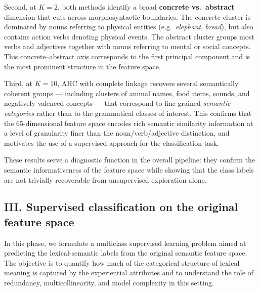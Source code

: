 \documentclass{ipgpmaster}
\begin{document}
Second, at $K = 2$, both methods identify a broad
\textbf{concrete vs.\ abstract} dimension that cuts across
morphosyntactic boundaries. The concrete cluster is dominated by nouns
referring to physical entities (e.g.\ \emph{elephant}, \emph{bread}),
but also contains action verbs denoting physical events.
The abstract cluster groups most verbs and adjectives together with
nouns referring to mental or social concepts.
This concrete--abstract axis corresponds to the first principal component
and is the most prominent structure in the feature space.

Third, at $K = 10$, AHC with complete linkage recovers several
semantically coherent groups — including clusters of animal names,
food items, sounds, and negatively valenced concepts — that correspond
to fine-grained \emph{semantic categories} rather than to the
grammatical classes of interest.
This confirms that the 65-dimensional feature space encodes rich
semantic similarity information at a level of granularity finer than
the noun/verb/adjective distinction, and motivates the use of a
supervised approach for the classification task.

These results serve a diagnostic function in the overall pipeline:
they confirm the semantic informativeness of the feature space while
showing that the class labels are not trivially recoverable from
unsupervised exploration alone.


\subsection{III. Supervised classification on the original feature space}

In this phase, we formulate a multiclass supervised learning problem aimed at predicting the lexical-semantic labels from the original semantic feature space. The objective is to quantify how much of the categorical structure of lexical meaning is captured by the experiential attributes and to understand the role of redundancy, multicollinearity, and model complexity in this setting.
\end{document}

